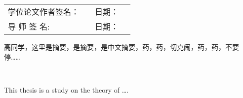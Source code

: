 \begin{flushright}\fangsong{}
	\begin{tabular}{lp{3cm}lp{3cm}}
		学位论文作者签名： & \underline{\makebox[3cm][l]{\hfill}} & 日期：& \underline{\makebox[3cm][l]{\hfill}} \\
		导 \hfill 师 \hfill 签 \hfill 名: & \underline{\makebox[3cm][l]{\hfill}} & 日期：& \underline{\makebox[3cm][l]{\hfill}} \\
	\end{tabular}
\end{flushright}


\begin{cnabstract}
高同学，这里是摘要，是摘要，是中文摘要，药，药，切克闹，药，药，不要停……

\end{cnabstract}
\vfill
{}\\[14pt]


\begin{enabstract}
This thesis is a study on the theory of \dots.

\end{enabstract}
\vfill
{}\\[14pt]
